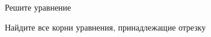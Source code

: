 \begin{ex}
	\begin{condition}
		\begin{enumcols}[label=\asbuk*)]
			\item Решите уравнение \(  \)
			\item Найдите все корни уравнения, принадлежащие отрезку \(  \)
		\end{enumcols}
	\end{condition}
	\answer{}
\end{ex}